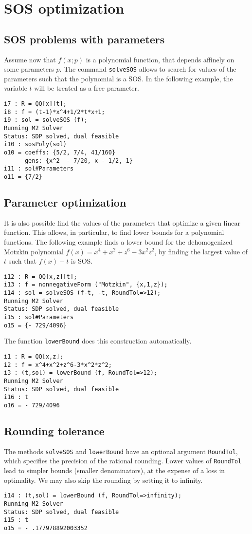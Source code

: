 \documentclass[11pt]{amsart}
\theoremstyle{plain}%
\theoremstyle{definition}
\theoremstyle{remark}
\begin{document}

\section{SOS optimization}

\subsection*{SOS problems with parameters}
Assume now that $f(x;p)$ is a polynomial function, that depends affinely on some parameters $p$.
The command \verb|solveSOS| allows to search for values of the parameters such that the polynomial is a SOS.
In the following example, the variable $t$ will be treated as a free parameter.
{\small
\begin{verbatim}
i7 : R = QQ[x][t];
i8 : f = (t-1)*x^4+1/2*t*x+1;
i9 : sol = solveSOS (f);
Running M2 Solver
Status: SDP solved, dual feasible
i10 : sosPoly(sol)
o10 = coeffs: {5/2, 7/4, 41/160}
      gens: {x^2  - 7/20, x - 1/2, 1}
i11 : sol#Parameters
o11 = {7/2}
\end{verbatim}
}

\subsection*{Parameter optimization}
It is also possible find the values of the parameters that optimize a given linear function.
This allows, in particular, to find lower bounds for a polynomial functions.
The following example finds a lower bound for the dehomogenized Motzkin polynomial $f(x)=x^4{+}x^2{+}z^6{-}3 x^2 z^2$, by finding the largest value of $t$ such that $f(x)-t$ is SOS.
{\small
\begin{verbatim}
i12 : R = QQ[x,z][t];
i13 : f = nonnegativeForm ("Motzkin", {x,1,z});
i14 : sol = solveSOS (f-t, -t, RoundTol=>12);
Running M2 Solver
Status: SDP solved, dual feasible
i15 : sol#Parameters
o15 = {- 729/4096}
\end{verbatim}
}
The function \verb|lowerBound| does this construction automatically.
{\small
\begin{verbatim}
i1 : R = QQ[x,z];
i2 : f = x^4+x^2+z^6-3*x^2*z^2;
i3 : (t,sol) = lowerBound (f, RoundTol=>12);
Running M2 Solver
Status: SDP solved, dual feasible
i16 : t
o16 = - 729/4096
\end{verbatim}
}

\subsection*{Rounding tolerance}
The methods \verb|solveSOS| and \verb|lowerBound| have an optional argument \verb|RoundTol|, which specifies the precision of the rational rounding.
Lower values of \verb|RoundTol| lead to simpler bounds (smaller denominators), at the expense of a loss in optimality.
We may also skip the rounding by setting it to infinity.
{\small
\begin{verbatim}
i14 : (t,sol) = lowerBound (f, RoundTol=>infinity);
Running M2 Solver
Status: SDP solved, dual feasible
i15 : t
o15 = - .177978892003352
\end{verbatim}
}
\end{document}
